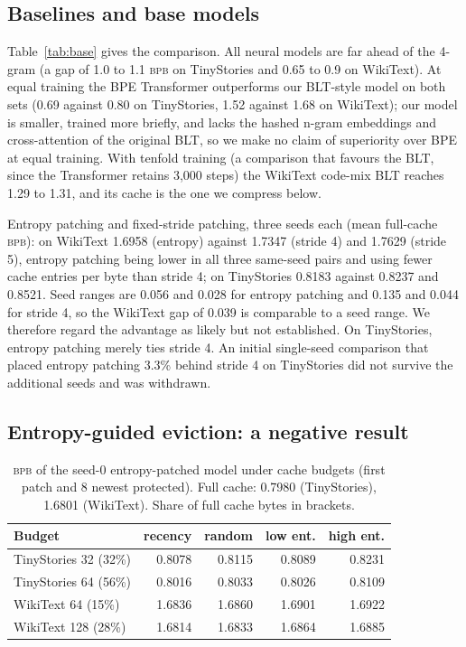 \documentclass[10pt,twocolumn]{extarticle}
\newcommand{\bpb}{\textsc{bpb}}
\begin{document}
\subsection{Baselines and base models}\label{sec:base}
Table~\ref{tab:base} gives the comparison. All neural models are far ahead of the 4-gram (a gap of 1.0 to 1.1 \bpb{} on TinyStories and 0.65 to 0.9 on WikiText). At equal training the BPE Transformer outperforms our BLT-style model on both sets (0.69 against 0.80 on TinyStories, 1.52 against 1.68 on WikiText); our model is smaller, trained more briefly, and lacks the hashed n-gram embeddings and cross-attention of the original BLT, so we make no claim of superiority over BPE at equal training. With tenfold training (a comparison that favours the BLT, since the Transformer retains 3,000 steps) the WikiText code-mix BLT reaches 1.29 to 1.31, and its cache is the one we compress below.

Entropy patching and fixed-stride patching, three seeds each (mean full-cache \bpb): on WikiText 1.6958 (entropy) against 1.7347 (stride 4) and 1.7629 (stride 5), entropy patching being lower in all three same-seed pairs and using fewer cache entries per byte than stride 4; on TinyStories 0.8183 against 0.8237 and 0.8521. Seed ranges are 0.056 and 0.028 for entropy patching and 0.135 and 0.044 for stride 4, so the WikiText gap of 0.039 is comparable to a seed range. We therefore regard the advantage as likely but not established. On TinyStories, entropy patching merely ties stride 4. An initial single-seed comparison that placed entropy patching 3.3\% behind stride 4 on TinyStories did not survive the additional seeds and was withdrawn.

\subsection{Entropy-guided eviction: a negative result}\label{sec:neg}
\begin{table}[t]
\centering\footnotesize
\caption{\bpb{} of the seed-0 entropy-patched model under cache budgets (first patch and 8 newest protected). Full cache: 0.7980 (TinyStories), 1.6801 (WikiText). Share of full cache bytes in brackets.}\label{tab:evict}
\begin{tabular}{@{}lrrrr@{}}
\toprule
Budget & recency & random & low ent. & high ent.\\
\midrule
TinyStories 32 (32\%) & 0.8078 & 0.8115 & 0.8089 & 0.8231\\
TinyStories 64 (56\%) & 0.8016 & 0.8033 & 0.8026 & 0.8109\\
WikiText 64 (15\%) & 1.6836 & 1.6860 & 1.6901 & 1.6922\\
WikiText 128 (28\%) & 1.6814 & 1.6833 & 1.6864 & 1.6885\\
\bottomrule
\end{tabular}
\end{table}
\end{document}
